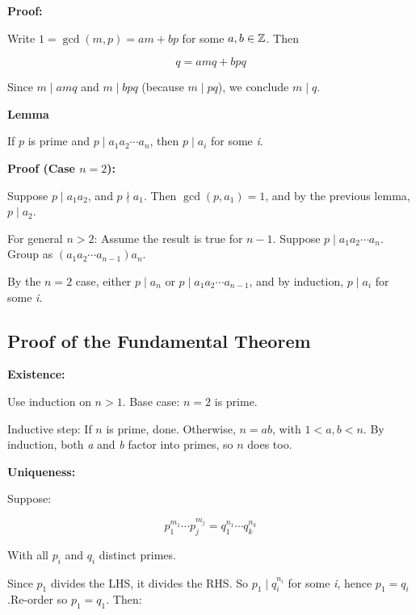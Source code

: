 \textbf{Proof:} 

Write \(1 = \gcd(m, p) = am + bp\) for some \(a, b \in \mathbb{Z}\). Then

\[
	q = amq + bpq
\]

Since \(m \mid amq\) and \(m \mid bpq\) (because \(m \mid pq\)), we conclude \(m \mid q\).

\QED

\textbf{Lemma} 

If \(p\) is prime and \(p \mid a_1a_2 \cdots a_n\), then \(p \mid a_i\) for some \emph{i}.
\vspace{\baselineskip}

\textbf{Proof (Case \(n=2\)):} 

Suppose \(p \mid a_1a_2\), and \(p \nmid a_1\).
Then \(\gcd(p, a_1) = 1\), and by the previous lemma, \(p \mid a_2\).
\vspace{\baselineskip}

For general \(n > 2\): Assume the result is true for \(n-1\). Suppose \(p \mid a_1a_2 \cdots a_n\).
Group as \((a_1a_2 \cdots a_{n-1})a_n\).
\vspace{\baselineskip}

By the \(n=2\) case, either \(p \mid a_n\) or \(p \mid a_1a_2 \cdots a_{n-1}\), and by induction, 
\(p \mid a_i\) for some \emph{i}.

\QED

\subsection{Proof of the Fundamental Theorem}

\textbf{Existence:}

Use induction on \(n > 1\). Base case: \(n = 2\) is prime.
\vspace{\baselineskip}

Inductive step: If \(n\) is prime, done. Otherwise, \(n = ab\), with \(1 < a, b < n\).
By induction, both \emph{a} and \emph{b} factor into primes, so \(n\) does too.
\vspace{\baselineskip}

\textbf{Uniqueness:}

Suppose:

\[
	p_1^{m_1} \cdots p_j^{m_j} = q_1^{n_1} \cdots q_k^{n_k}
\]

With all \(p_i\) and \(q_i\) distinct primes.
\vspace{\baselineskip}

Since \(p_1\) divides the LHS, it divides the RHS. So \(p_1 \mid q_i^{n_i}\) for some \emph{i}, hence 
\(p_1 = q_i\).Re-order so \(p_1 = q_1\). Then:

